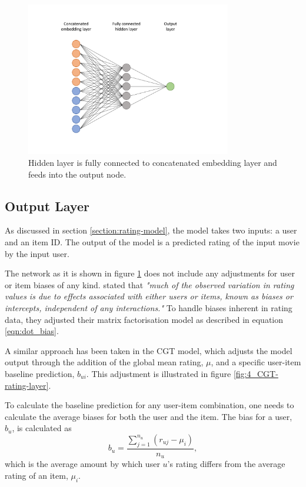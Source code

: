 \begin{figure}[H]
\centering
\includegraphics[width=0.8\textwidth]{Figures/4_CGT-hidden.pdf}
\decoRule
\caption[Rating model hidden layer]{Hidden layer is fully connected to concatenated embedding layer and feeds into the output node.}
\label{fig:4_CGT-hidden-layer}
\end{figure}

\subsection{Output Layer}
As discussed in section \ref{section:rating-model}, the model takes two inputs: a user and an item ID. The output of the model is a predicted rating of the input movie by the input user. 

The network as it is shown in figure \ref{fig:4_CGT-hidden-layer} does not include any adjustments for user or item biases of any kind. \citeauthor{koren2009matrix} stated that \textit{"much of the observed variation in rating values is due to effects associated with either users or items, known as biases or intercepts, independent of any interactions."} To handle biases inherent in rating data, they adjusted their matrix factorisation model as described in equation \ref{eqn:dot_bias}.

A similar approach has been taken in the CGT model, which adjusts the model output through the addition of the global mean rating, $\mu$, and a specific user-item baseline prediction, $b_{ui}$. This adjustment is illustrated in figure \ref{fig:4_CGT-rating-layer}. 

To calculate the baseline prediction for any user-item combination, one needs to calculate the average biases for both the user and the item. The bias for a user, $b_u$, is calculated as 
\begin{equation}
    b_{u} = \dfrac{\sum_{j=1}^{n_u} (r_{uj} - \mu_i)}{n_u},
\label{eqn:CGT-user-bias}
\end{equation}
which is the average amount by which user $u$'s rating differs from the average rating of an item, $\mu_i$.

